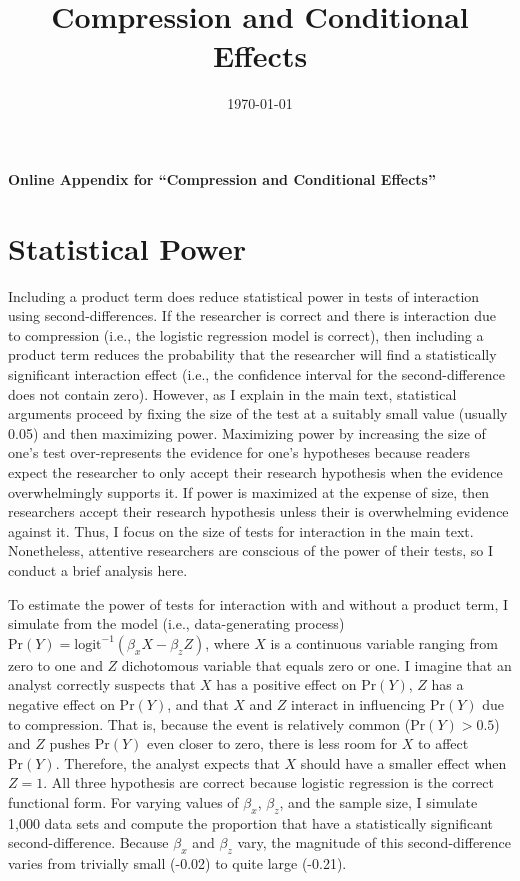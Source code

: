 \documentclass[12pt]{article}
\title{Compression and Conditional Effects}
\date{\today}
\begin{document}
\begin{appendix}
\singlespace

\begin{center}
\LARGE{\textbf{Online Appendix for ``Compression and Conditional Effects''}}\vspace{4mm}
\end{center}
\section{Statistical Power}

Including a product term does reduce statistical power in tests of interaction using second-differences. If the researcher is correct and there is interaction due to compression (i.e., the logistic regression model is correct), then including a product term reduces the probability that the researcher will find a statistically significant interaction effect (i.e., the confidence interval for the second-difference does not contain zero). However, as I explain in the main text, statistical arguments proceed by fixing the size of the test at a suitably small value (usually 0.05) and then maximizing power. Maximizing power by increasing the size of one's test over-represents the evidence for one's hypotheses because readers expect the researcher to only accept their research hypothesis when the evidence overwhelmingly supports it. If power is maximized at the expense of size, then researchers accept their research hypothesis unless their is overwhelming evidence against it. Thus, I focus on the size of tests for interaction in the main text. Nonetheless, attentive researchers are conscious of the power of their tests, so I conduct a brief analysis here.

To estimate the power of tests for interaction with and without a product term, I simulate from the model (i.e., data-generating process) $\text{Pr}(Y) = \text{logit}^{-1}(\beta_xX - \beta_zZ)$, where $X$ is a continuous variable ranging from zero to one and $Z$ dichotomous variable that equals zero or one. I imagine that an analyst correctly suspects that $X$ has a positive effect on $\text{Pr}(Y)$, $Z$ has a negative effect on $\text{Pr}(Y)$, and that $X$ and $Z$ interact in influencing $\text{Pr}(Y)$ due to compression. That is, because the event is relatively common ($\text{Pr}(Y) > 0.5$) and $Z$ pushes $\text{Pr}(Y)$ even closer to zero, there is less room for $X$ to affect $\text{Pr}(Y)$. Therefore, the analyst expects that $X$ should have a smaller effect when $Z=1$. All three hypothesis are correct because logistic regression is the correct functional form. For varying values of $\beta_x$, $\beta_z$, and the sample size, I simulate 1,000 data sets and compute the proportion that have a statistically significant second-difference. Because $\beta_x$ and $\beta_z$ vary, the magnitude of this second-difference varies from trivially small (-0.02) to quite large (-0.21).


\end{appendix}
\end{document}
